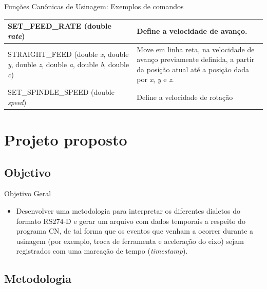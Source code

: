 \documentclass[aspectratio=169]{beamer}
\begin{document}
{\begin{frame}{Funções Canônicas de Usinagem: Exemplos de comandos}
\begin{table}[H]
\begin{tabular}{p{7cm}|p{5cm}}
      \hline  
      \scriptsize{SET\_FEED\_RATE (double \emph{rate})}
      & \scriptsize{Define a velocidade de avan\c co.} \\

      \hline  
      \scriptsize{STRAIGHT\_FEED (double \emph{x}, double \emph{y}, double \emph{z}, 
      double \emph{a}, double \emph{b}, double \emph{c})} 
      & \scriptsize{Move em linha reta, na velocidade de avan\c co previamente definida, 
      a partir da posi\c c\~ao atual at\'e a 
      posi\c c\~ao dada por \emph{x}, \emph{y} e \emph{z}.} \\

      \hline  
      \scriptsize{SET\_SPINDLE\_SPEED (double \emph{speed})} 
      & \scriptsize{Define a velocidade de rotação} \\

      \hline

    \end{tabular}
  \end{table}
\end{frame}


\section{Projeto proposto}

\subsection{Objetivo}

\begin{frame}{Objetivo Geral}
  \begin{itemize}
    \item {
      Desenvolver uma metodologia para interpretar os diferentes dialetos do formato RS274-D
      e gerar um arquivo com dados temporais a respeito do programa CN, de tal forma que 
      os eventos que venham a ocorrer durante a usinagem (por exemplo, troca de ferramenta 
      e aceleração do eixo) sejam registrados com uma marca\c c\~ao de tempo (\emph{timestamp}).
    }
  \end{itemize}
\end{frame}

\subsection{Metodologia}

}
\end{document}
